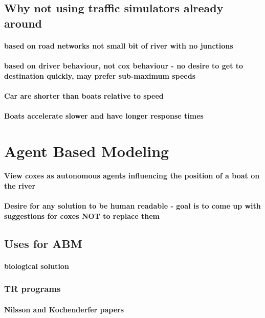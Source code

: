       \subsection{Why not using traffic simulators already around}
        \paragraph{based on road networks not small bit of river with no junctions}
        \paragraph{based on driver behaviour, not cox behaviour - no desire to get to destination quickly, may prefer sub-maximum speeds}
        \paragraph{Car are shorter than boats relative to speed}
        \paragraph{Boats accelerate slower and have longer response times}
  \section{Agent Based Modeling}
    \paragraph{View coxes as autonomous agents influencing the position of a boat on the river}
    \paragraph{Desire for any solution to be human readable - goal is to come up with suggestions for coxes NOT to replace them}
    \subsection{Uses for ABM}
      \paragraph{biological solution}
    
      
      \subsubsection{TR programs}
        \paragraph{Nilsson and Kochenderfer papers}
        
  